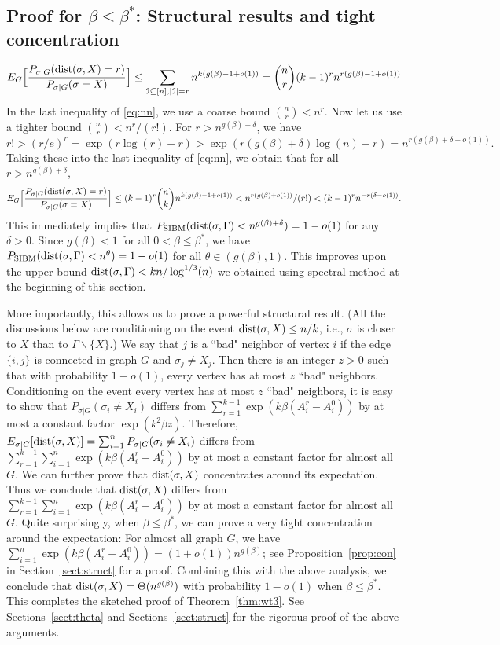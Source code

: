 \documentclass{article}
\begin{document}
\subsection{Proof for $\beta\le\beta^\ast$: Structural results and tight concentration}
\begin{equation} \label{eq:nn}
E_G \Big[ \frac{P_{\sigma|G} ( \operatorname{dist}(\sigma, X) = r)}{P_{\sigma|G}(\sigma= X)} \Big]
\le \sum_{\mathcal{I}\subseteq[n],|\mathcal{I}|=r} 
n^{k (g(\beta)-1+o(1))}
= \binom{n}{r} (k-1)^r n^{r (g(\beta)-1+o(1))}
\end{equation}
In the last inequality of \eqref{eq:nn}, we use a coarse bound $\binom{n}{r}<n^r$. Now let us use a tighter bound $\binom{n}{r}<n^r/(r!)$. 
For $r>n^{g(\beta)+\delta}$, we have
$
r!>(r/e)^r
=\exp(r\log(r)-r)
>\exp(r(g(\beta)+\delta)\log(n)-r)
=n^{r(g(\beta)+\delta-o(1))} .
$
Taking these into the last inequality of \eqref{eq:nn}, we obtain that for all $r>n^{g(\beta)+\delta}$,
$$
E_G \Big[ \frac{P_{\sigma|G} ( \operatorname{dist}(\sigma, X) = r )}{P_{\sigma|G}(\sigma= X)} \Big]
\le  (k-1)^r\binom{n}{k} n^{k (g(\beta)-1+o(1))}
< n^{r (g(\beta)+o(1))} /(r!) 
< (k-1)^rn^{-r(\delta-o(1))} .
$$
This immediately implies that  $P_{\operatorname{SIBM}} (\operatorname{dist}(\sigma, \Gamma)<n^{g(\beta)+\delta} ) = 1- o(1)$ for any $\delta>0$. Since $g(\beta)<1$ for all $0<\beta\le\beta^\ast$, we have $P_{\operatorname{SIBM}} (\operatorname{dist}(\sigma, \Gamma)<n^{\theta} ) = 1- o(1)$ for all $\theta\in (g(\beta), 1)$. This improves upon the upper bound 
$\operatorname{dist}(\sigma, \Gamma)< kn/\log^{1/3}(n)$ we obtained using spectral method at the beginning of this section.

More importantly, this allows us to prove a powerful structural result. (All the discussions below are conditioning on the event $\operatorname{dist}(\sigma,X)\le n/k$, i.e., $\sigma$ is closer to $X$ than to $\Gamma\backslash\{X\}$.) We say that $j$ is a ``bad" neighbor of vertex $i$ if the edge $\{i,j\}$ is connected in graph $G$ and $\sigma_j\neq X_j$. Then there is an integer $z>0$ such that with probability $1-o(1)$, every vertex has at most $z$ ``bad" neighbors.
Conditioning on the event every vertex has at most $z$ ``bad" neighbors, it is easy to show that $P_{\sigma|G}(\sigma_i \neq X_i)$ differs from $\sum_{r=1}^{k-1}\exp (k \beta (A^r_i-A^0_i))$ by at most a constant factor $\exp(k^2\beta z)$.
Therefore, $E_{\sigma|G}[\operatorname{dist}(\sigma,X)]=\sum_{i=1}^n P_{\sigma|G}(\sigma_i \neq X_i)$ differs from $\sum_{r=1}^{k-1} \sum_{i=1}^n\exp (k \beta (A^r_i-A^0_i))$ by at most a constant factor for almost all $G$.
We can further prove that $\operatorname{dist}(\sigma,X)$ concentrates around its expectation. Thus we conclude that $\operatorname{dist}(\sigma,X)$ differs from $\sum_{r=1}^{k-1} \sum_{i=1}^n\exp (k \beta (A^r_i-A^0_i))$ by at most a constant factor for almost all $G$.
Quite surprisingly, when $\beta\le\beta^\ast$, we can prove a very tight concentration around the expectation: For almost all graph $G$, we have $\sum_{i=1}^n\exp (k \beta (A^r_i-A^0_i))=(1+o(1))n^{g(\beta)}$; see Proposition~\ref{prop:con} in Section~\ref{sect:struct} for a proof. Combining this with the above analysis, we conclude that $\operatorname{dist}(\sigma,X)=\Theta(n^{g(\beta)})$ with probability $1-o(1)$ when $\beta\le\beta^\ast$. This completes the sketched proof of Theorem~\ref{thm:wt3}.
See Sections~\ref{sect:theta} and Sections~\ref{sect:struct} for the rigorous proof of the above arguments.
\end{document}
